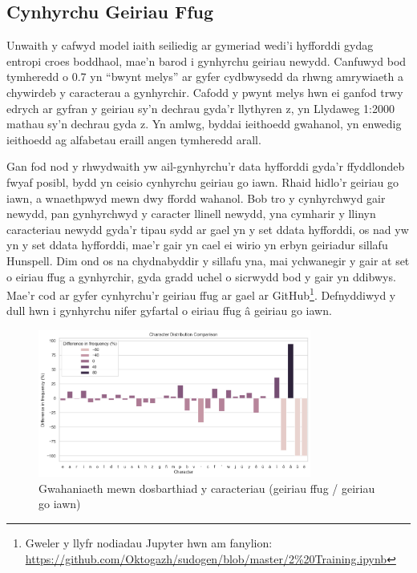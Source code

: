 \subsection{Cynhyrchu Geiriau Ffug}
Unwaith y cafwyd model iaith seiliedig ar gymeriad wedi'i hyfforddi gydag entropi croes boddhaol, mae'n barod i gynhyrchu geiriau newydd. Canfuwyd bod tymheredd o 0.7 yn ``bwynt melys'' ar gyfer cydbwysedd da rhwng amrywiaeth a chywirdeb y caracterau a gynhyrchir. Cafodd y pwynt melys hwn ei ganfod trwy edrych ar gyfran y geiriau sy'n dechrau gyda'r llythyren z, yn Llydaweg 1:2000 mathau sy'n dechrau gyda z. Yn amlwg, byddai ieithoedd gwahanol, yn enwedig ieithoedd ag alfabetau eraill angen tymheredd arall.

Gan fod nod y rhwydwaith yw ail-gynhyrchu'r data hyfforddi gyda'r ffyddlondeb fwyaf posibl, bydd yn ceisio cynhyrchu geiriau go iawn. Rhaid hidlo'r geiriau go iawn, a wnaethpwyd mewn dwy ffordd wahanol. Bob tro y cynhyrchwyd gair newydd, pan gynhyrchwyd y caracter llinell newydd, yna cymharir y llinyn caracteriau newydd gyda'r tipau sydd ar gael yn y set ddata hyfforddi, os nad yw yn y set ddata hyfforddi, mae'r gair yn cael ei wirio yn erbyn geiriadur sillafu Hunspell. Dim ond os na chydnabyddir y sillafu yna, mai ychwanegir y gair at set o eiriau ffug a gynhyrchir, gyda gradd uchel o sicrwydd bod y gair yn ddibwys. Mae'r cod ar gyfer cynhyrchu'r geiriau ffug ar gael ar GitHub\footnote{Gweler y llyfr nodiadau Jupyter hwn am fanylion: \url{https://github.com/Oktogazh/sudogen/blob/master/2\%20Training.ipynb}}. Defnyddiwyd y dull hwn i gynhyrchu nifer gyfartal o eiriau ffug â geiriau go iawn.

\begin{figure}[htbp]
    \centering
    \includegraphics[width=0.8\textwidth]{figures/chars.png}
    \caption{Gwahaniaeth mewn dosbarthiad y caracteriau (geiriau ffug / geiriau go iawn)}
\end{figure}\label{fig:chars}

